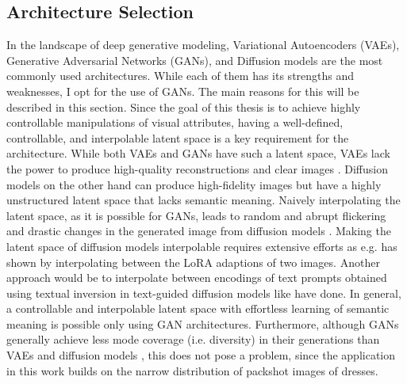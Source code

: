\subsection{Architecture Selection}
In the landscape of deep generative modeling, Variational Autoencoders (VAEs), Generative Adversarial Networks (GANs), and Diffusion models are the most commonly used architectures. While each of them has its strengths and weaknesses, I opt for the use of GANs. The main reasons for this will be described in this section. Since the goal of this thesis is to achieve highly controllable manipulations of visual attributes, having a well-defined, controllable, and interpolable latent space is a key requirement for the architecture. While both VAEs and GANs have such a latent space, VAEs lack the power to produce high-quality reconstructions \citep[p.2]{muller2024disentangling} and clear images \citep[p.1]{wang2020state}. Diffusion models on the other hand can produce high-fidelity images but have a highly unstructured latent space that lacks semantic meaning. Naively interpolating the latent space, as it is possible for GANs, leads to random and abrupt flickering and drastic changes in the generated image from diffusion models \citep[p.2]{zhang2024diffmorpher}. Making the latent space of diffusion models interpolable requires extensive efforts as e.g. \cite{zhang2024diffmorpher} has shown by interpolating between the LoRA \citep{hu2021lora} adaptions of two images. Another approach would be to interpolate between encodings of text prompts obtained using textual inversion in text-guided diffusion models like \cite{wang2023interpolating} have done. In general, a controllable and interpolable latent space with effortless learning of semantic meaning is possible only using GAN architectures. Furthermore, although GANs generally achieve less mode coverage (i.e. diversity) in their generations than VAEs and diffusion models \citep[p.1]{xiao2021tackling}, this does not pose a problem, since the application in this work builds on the narrow distribution of packshot images of dresses.